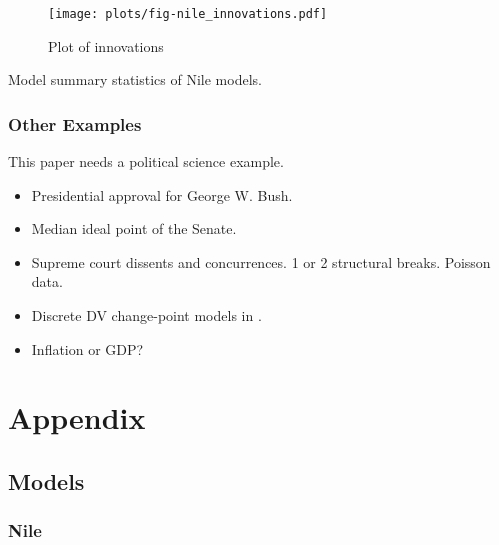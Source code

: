 \documentclass{article}
\begin{document}
\begin{figure}[htpb]
  \centering
  \texttt{[image: plots/fig-nile\_innovations.pdf]}
  \caption{Plot of innovations}
  \label{fig:nile_innovations}
\end{figure}

\begin{table}[htpb]
  \centering
  
  \caption{Model summary statistics of Nile models.}
  \label{tab:nile}
\end{table}

\clearpage{}

\subsubsection{Other Examples}

This paper needs a political science example.

\begin{itemize}
\item Presidential approval for George W. Bush. \parencites{RatkovicEng2010}
\item Median ideal point of the Senate. \parencites{RatkovicEng2010}
\item Supreme court dissents and concurrences. 1 or 2 structural breaks. Poisson data. \parencite{CalderiaZorn1998}
\item Discrete DV change-point models in \parencite{spirling2007bayesian}.
\item Inflation or GDP?
\end{itemize}

\section{Appendix}
\label{sec:appendix}


\subsection{Models}
\label{sec:models}

\subsubsection{Nile}
\label{sec:nile-1}
\end{document}
